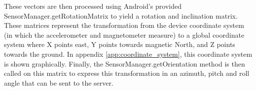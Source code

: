 \documentclass[a4paper, notitlepage]{report}
\begin{document}
These vectors are then processed using Android's provided SensorManager.getRotationMatrix to yield a rotation and inclination matrix. These matrices represent the transformation from the device coordinate system (in which the accelerometer and magnetometer measure) to a global coordinate system where X points east, Y points towards magnetic North, and Z points towards the ground. In appendix \ref{app:coordinate_system}, this coordinate system is shown graphically. Finally, the SensorManager.getOrientation method is then called on this matrix to express this transformation in an azimuth, pitch and roll angle that can be sent to the server.
\end{document}
